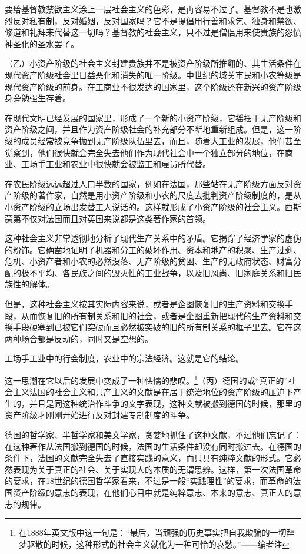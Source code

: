 \documentclass[UTF8,zihao=-4,a4paper]{ctexart}
\begin{document}
要给基督教禁欲主义涂上一层社会主义的色彩，是再容易不过了。基督教不是也激烈反对私有制，反对婚姻，反对国家吗？它不是提倡用行善和求乞、独身和禁欲、修道和礼拜来代替这一切吗？基督教的社会主义，只不过是僧侣用来使贵族的怨愤神圣化的圣水罢了。\par
（乙）小资产阶级的社会主义封建贵族并不是被资产阶级所推翻的、其生活条件在现代资产阶级社会里日益恶化和消失的唯一阶级。中世纪的城关市民和小农等级是现代资产阶级的前身。在工商业不很发达的国家里，这个阶级还在新兴的资产阶级身旁勉强生存着。\par
在现代文明已经发展的国家里，形成了一个新的小资产阶级，它摇摆于无产阶级和资产阶级之间，并且作为资产阶级社会的补充部分不断地重新组成。但是，这一阶级的成员经常被竞争拋到无产阶级队伍里去，而且，随着大工业的发展，他们甚至觉察到，他们很快就会完全失去他们作为现代社会中一个独立部分的地位，在商业、工场手工业和农业中很快就会被监工和雇员所代替。\par
在农民阶级远远超过人口半数的国家，例如在法国，那些站在无产阶级方面反对资产阶级的著作家，自然是用小资产阶级和小农的尺度去批判资产阶级制度的，是从小资产阶级的立场出发替工人说话的。这样就形成了小资产阶级的社会主义。西斯蒙第不仅对法国而且对英国来说都是这类著作家的首领。\par
这种社会主义非常透彻地分析了现代生产关系中的矛盾。它揭穿了经济学家的虚伪的粉饰。它确凿地证明了机器和分工的破坏作用、资本和地产的积聚、生产过剩、危机、小资产者和小农的必然没落、无产阶级的贫困、生产的无政府状态、财富分配的极不平均、各民族之间的毁灭性的工业战争，以及旧风尚、旧家庭关系和旧民族性的解体。\par
但是，这种社会主义按其实际内容来说，或者是企图恢复旧的生产资料和交换手段，从而恢复旧的所有制关系和旧的社会，或者是企图重新把现代的生产资料和交换手段硬塞到已被它们突破而且必然被突破的旧的所有制关系的框子里去。它在这两种场合都是反动的，同时又是空想的。\par
工场手工业中的行会制度，农业中的宗法经济。这就是它的结论。\par
这一思潮在它以后的发展中变成了一种怯懦的悲叹。\footnote{在1888年英文版中这一句是：“最后，当顽强的历史事实把自我欺骗的一切醉梦驱散的时候，这种形式的社会主义就化为一种可怜的哀愁。”——编者注}（丙）德国的或“真正的”社会主义法国的社会主义和共产主义的文献是在居于统治地位的资产阶级的压迫下产生的，并且是同这种统治作斗争的文字表现，这种文献被搬到德国的时候，那里的资产阶级才刚刚开始进行反对封建专制制度的斗争。\par
德国的哲学家、半哲学家和美文学家，贪婪地抓住了这种文献，不过他们忘记了：在这种著作从法国搬到德国的时候，法国的生活条件却没有同时搬过去。在德国的条件下，法国的文献完全失去了直接实践的意义，而只具有纯粹文献的形式。它必然表现为关于真正的社会、关于实现人的本质的无谓思辨。这样，第一次法国革命的要求，在18世纪的德国哲学家看来，不过是一般“实践理性”的要求，而革命的法国资产阶级的意志的表现，在他们心目中就是纯粹意志、本来的意志、真正人的意志的规律。\par
\end{document}
